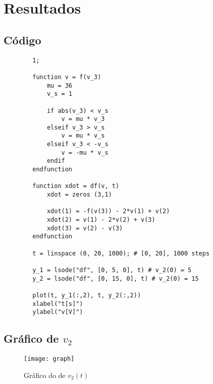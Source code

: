 \section{Resultados}
    \subsection{Código}
        \begin{lstlisting}
        1;

        function v = f(v_3)
            mu = 36
            v_s = 1

            if abs(v_3) < v_s
                v = mu * v_3
            elseif v_3 > v_s
                v = mu * v_s
            elseif v_3 < -v_s
                v = -mu * v_s
            endif
        endfunction

        function xdot = df(v, t)
            xdot = zeros (3,1)
            
            xdot(1) = -f(v(3)) - 2*v(1) + v(2)
            xdot(2) = v(1) - 2*v(2) + v(3)
            xdot(3) = v(2) - v(3)
        endfunction
        
        t = linspace (0, 20, 1000); # [0, 20], 1000 steps

        y_1 = lsode("df", [0, 5, 0], t) # v_2(0) = 5
        y_2 = lsode("df", [0, 15, 0], t) # v_2(0) = 15

        plot(t, y_1(:,2), t, y_2(:,2))
        xlabel("t[s]")
        ylabel("v[V]")
        \end{lstlisting}

    \subsection{Gráfico de $v_2$}
        \begin{figure} [H] 
            \texttt{[image: graph]}
            \caption{Gráfico do de $v_2(t)$}
            \label{fig:fraphV2}
        \end{figure}